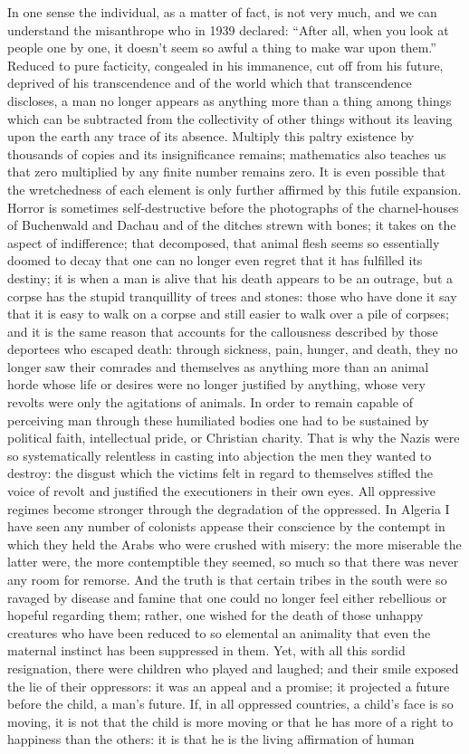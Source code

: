\documentclass[11pt]{article}
\begin{document}
{{In one sense the individual, as a matter of fact, is not very much, and we can understand the misanthrope who in 1939 declared: “After all, when you look at people one by one, it doesn’t seem so awful a thing to make war upon them.” Reduced to pure facticity, congealed in his immanence, cut off from his future, deprived of his transcendence and of the world which that transcendence discloses, a man no longer appears as anything more than a thing among things which can be subtracted from the collectivity of other things without its leaving upon the earth any trace of its absence. Multiply this paltry existence by thousands of copies and its insignificance remains; mathematics also teaches us that zero multiplied by any finite number remains zero. It is even possible that the wretchedness of each element is only further affirmed by this futile expansion. Horror is sometimes self-destructive before the photographs of the charnel-houses of Buchenwald and Dachau and of the ditches strewn with bones; it takes on the aspect of indifference; that decomposed, that animal flesh seems so essentially doomed to decay that one can no longer even regret that it has fulfilled its destiny; it is when a man is alive that his death appears to be an outrage, but a corpse has the stupid tranquillity of trees and stones: those who have done it say that it is easy to walk on a corpse and still easier to walk over a pile of corpses; and it is the same reason that accounts for the callousness described by those deportees who escaped death: through sickness, pain, hunger, and death, they no longer saw their comrades and themselves as anything more than an animal horde whose life or desires were no longer justified by anything, whose very revolts were only the agitations of animals. In order to remain capable of perceiving man through these humiliated bodies one had to be sustained by political faith, intellectual pride, or Christian charity. That is why the Nazis were so systematically relentless in casting into abjection the men they wanted to destroy: the disgust which the victims felt in regard to themselves stifled the voice of revolt and justified the executioners in their own eyes. All oppressive regimes become stronger through the degradation of the oppressed. In Algeria I have seen any number of colonists appease their conscience by the contempt in which they held the Arabs who were crushed with misery: the more miserable the latter were, the more contemptible they seemed, so much so that there was never any room for remorse. And the truth is that certain tribes in the south were so ravaged by disease and famine that one could no longer feel either rebellious or hopeful regarding them; rather, one wished for the death of those unhappy creatures who have been reduced to so elemental an animality that even the maternal instinct has been suppressed in them. Yet, with all this sordid resignation, there were children who played and laughed; and their smile exposed the lie of their oppressors: it was an appeal and a promise; it projected a future before the child, a man’s future. If, in all oppressed countries, a child’s face is so moving, it is not that the child is more moving or that he has more of a right to happiness than the others: it is that he is the living affirmation of human }}
\end{document}
